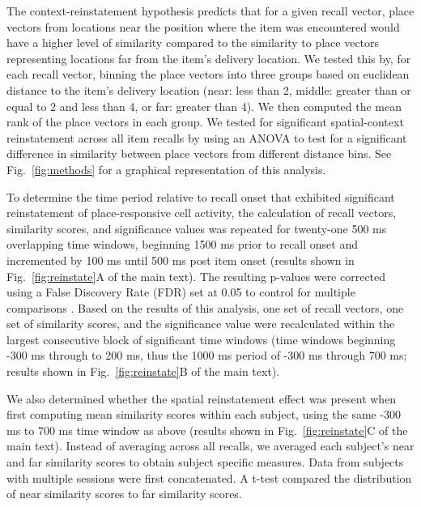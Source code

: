 The context-reinstatement hypothesis predicts that for a given recall vector, place vectors from locations near the position where the item was encountered would have a higher level of similarity compared to the similarity to place vectors representing locations far from the item's delivery location.  We tested this by, for each recall vector, binning the place vectors into three groups based on euclidean distance to the item's delivery location (near: less than 2, middle: greater than or equal to 2 and less than 4, or far: greater than 4). We then computed the mean rank of the place vectors in each group.  We tested for significant spatial-context reinstatement across all item recalls by using an ANOVA to test for a significant difference in similarity between place vectors from different distance bins. See Fig.~\ref{fig:methods} for a graphical representation of this analysis.

To determine the time period relative to recall onset that exhibited significant reinstatement of place-responsive cell activity, the calculation of recall vectors, similarity scores, and significance values was repeated for twenty-one 500 ms overlapping time windows, beginning 1500 ms prior to recall onset and incremented by 100 ms until 500 ms post item onset (results shown in Fig.~\ref{fig:reinstate}A of the main text).  The resulting p-values were corrected using a False Discovery Rate (FDR) set at 0.05 to control for multiple comparisons \cite{BenjHoch95}. Based on the results of this analysis, one set of recall vectors, one set of similarity scores, and the significance value were recalculated within the largest consecutive block of significant time windows (time windows beginning -300 ms through to 200 ms, thus the 1000 ms period of -300 ms through 700 ms; results shown in Fig.~\ref{fig:reinstate}B of the main text).

We also determined whether the spatial reinstatement effect was present when first computing mean similarity scores within each subject, using the same -300 ms to 700 ms time window as above (results shown in Fig.~\ref{fig:reinstate}C of the main text). Instead of averaging across all recalls, we averaged each subject's near and far similarity scores to obtain subject specific measures. Data from subjects with multiple sessions were first concatenated. A t-test compared the distribution of near similarity scores to far similarity scores.

